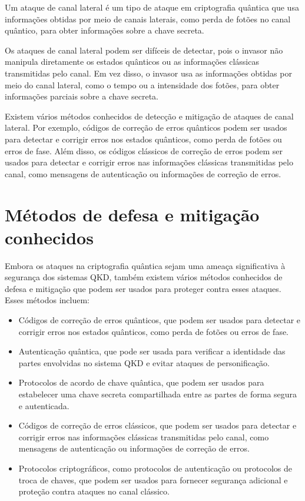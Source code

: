 Um ataque de canal lateral é um tipo de ataque em criptografia quântica que usa informações obtidas por meio de canais laterais, como perda de fotões no canal quântico, para obter informações sobre a chave secreta.

Os ataques de canal lateral podem ser difíceis de detectar, pois o invasor não manipula diretamente os estados quânticos ou as informações clássicas transmitidas pelo canal. Em vez disso, o invasor usa as informações obtidas por meio do canal lateral, como o tempo ou a intensidade dos fotões, para obter informações parciais sobre a chave secreta.

Existem vários métodos conhecidos de detecção e mitigação de ataques de canal lateral. Por exemplo, códigos de correção de erros quânticos podem ser usados para detectar e corrigir erros nos estados quânticos, como perda de fotões ou erros de fase. Além disso, os códigos clássicos de correção de erros podem ser usados para detectar e corrigir erros nas informações clássicas transmitidas pelo canal, como mensagens de autenticação ou informações de correção de erros.

\section{Métodos de defesa e mitigação conhecidos}

Embora os ataques na criptografia quântica sejam uma ameaça significativa à segurança dos sistemas QKD, também existem vários métodos conhecidos de defesa e mitigação que podem ser usados para proteger contra esses ataques. Esses métodos incluem:

\begin{itemize}
  \item Códigos de correção de erros quânticos, que podem ser usados para detectar e corrigir erros nos estados quânticos, como perda de fotões ou erros de fase.
  \item Autenticação quântica, que pode ser usada para verificar a identidade das partes envolvidas no sistema QKD e evitar ataques de personificação.
  \item Protocolos de acordo de chave quântica, que podem ser usados para estabelecer uma chave secreta compartilhada entre as partes de forma segura e autenticada.
  \item Códigos de correção de erros clássicos, que podem ser usados para detectar e corrigir erros nas informações clássicas transmitidas pelo canal, como mensagens de autenticação ou informações de correção de erros.
  \item Protocolos criptográficos, como protocolos de autenticação ou protocolos de troca de chaves, que podem ser usados para fornecer segurança adicional e proteção contra ataques no canal clássico.
\end{itemize}

